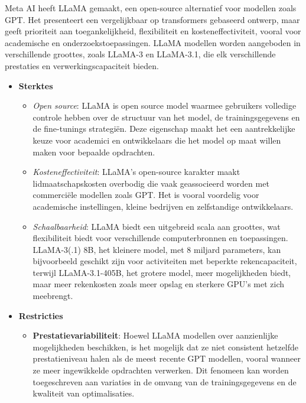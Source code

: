 Meta AI heeft LLaMA gemaakt, een open-source alternatief voor modellen zoals GPT. Het presenteert een vergelijkbaar op transformers gebaseerd ontwerp, maar geeft prioriteit aan toegankelijkheid, flexibiliteit en kosteneffectiviteit, vooral voor academische en onderzoekstoepassingen. LLaMA modellen worden aangeboden in verschillende groottes, zoals LLaMA-3 en LLaMA-3.1, die elk verschillende prestaties en verwerkingscapaciteit bieden.


\begin{itemize}
    \item \textbf{Sterktes}
    \begin{itemize}
        \item \textit{Open source}:  LLaMA is open source model waarmee gebruikers volledige controle hebben over de structuur van het model, de trainingsgegevens en de fine-tunings strategiën. Deze eigenschap maakt het een aantrekkelijke keuze voor academici en ontwikkelaars die het model op maat willen maken voor bepaalde opdrachten.
        \item \textit{Kosteneffectiviteit}: LLaMA's open-source karakter maakt lidmaatschapskosten overbodig die vaak geassocieerd worden met commerciële modellen zoals GPT. Het is vooral voordelig voor academische instellingen, kleine bedrijven en zelfstandige ontwikkelaars.
        \item \textit{Schaalbaarheid}: LLaMA biedt een uitgebreid scala aan groottes, wat flexibiliteit biedt voor verschillende computerbronnen en toepassingen. LLaMA-3(.1) 8B, het kleinere model, met 8 miljard parameters, kan bijvoorbeeld geschikt zijn voor activiteiten met beperkte rekencapaciteit, terwijl LLaMA-3.1-405B, het grotere model, meer mogelijkheden biedt, maar meer rekenkosten zoals meer opslag en sterkere GPU's met zich meebrengt.
            
       
      
    \end{itemize}
    
    \item \textbf{Restricties}
    \begin{itemize}
        \item \textbf{Prestatievariabiliteit}: Hoewel LLaMA modellen over aanzienlijke mogelijkheden beschikken, is het mogelijk dat ze niet consistent hetzelfde prestatieniveau halen als de meest recente GPT modellen, vooral wanneer ze meer ingewikkelde opdrachten verwerken. Dit fenomeen kan worden toegeschreven aan variaties in de omvang van de trainingsgegevens en de kwaliteit van optimalisaties.
    \end{itemize}
\end{itemize}


